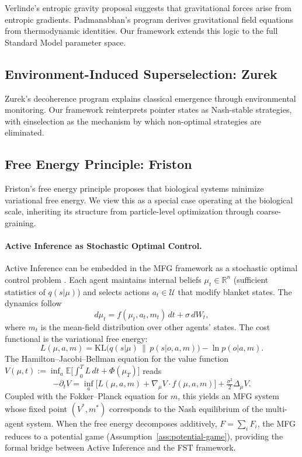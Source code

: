 \documentclass[12pt,a4paper]{article}
\theoremstyle{remark}
\begin{document}
Verlinde's entropic gravity proposal \citep{Verlinde2011} suggests that gravitational forces arise from entropic gradients. Padmanabhan's program \citep{Padmanabhan2010} derives gravitational field equations from thermodynamic identities. Our framework extends this logic to the full Standard Model parameter space.

\subsection{Environment-Induced Superselection: Zurek}

Zurek's decoherence program \citep{Zurek2003} explains classical emergence through environmental monitoring. Our framework reinterprets pointer states as Nash-stable strategies, with einselection as the mechanism by which non-optimal strategies are eliminated.

\subsection{Free Energy Principle: Friston}

Friston's free energy principle \citep{Friston2010} proposes that biological systems minimize variational free energy. We view this as a special case operating at the biological scale, inheriting its structure from particle-level optimization through coarse-graining.

\paragraph{Active Inference as Stochastic Optimal Control.}
Active Inference can be embedded in the MFG framework as a stochastic optimal control problem \citep{LasryLions2006,LasryLions2007}. Each agent maintains internal beliefs $\mu_t \in \mathbb{R}^n$ (sufficient statistics of $q(s|\mu)$) and selects actions $a_t \in \mathcal{U}$ that modify blanket states. The dynamics follow
\[
  d\mu_t = f(\mu_t, a_t, m_t)\,dt + \sigma\,dW_t,
\]
where $m_t$ is the mean-field distribution over other agents' states. The cost functional is the variational free energy:
\[
  L(\mu, a, m) = \mathrm{KL}\bigl(q(s|\mu) \,\|\, p(s|o,a,m)\bigr) - \ln p(o|a,m).
\]
The Hamilton--Jacobi--Bellman equation for the value function $V(\mu,t) := \inf_{a} \mathbb{E}\bigl[\int_0^T L\,dt + \Phi(\mu_T)\bigr]$ reads
\[
  -\partial_t V = \inf_a\bigl[L(\mu,a,m) + \nabla_\mu V \cdot f(\mu,a,m)\bigr] + \tfrac{\sigma^2}{2}\Delta_\mu V.
\]
Coupled with the Fokker--Planck equation for $m$, this yields an MFG system whose fixed point $(V^*, m^*)$ corresponds to the Nash equilibrium of the multi-agent system. When the free energy decomposes additively, $F = \sum_i F_i$, the MFG reduces to a potential game (Assumption~\ref{ass:potential-game}), providing the formal bridge between Active Inference and the FST framework.
\end{document}
